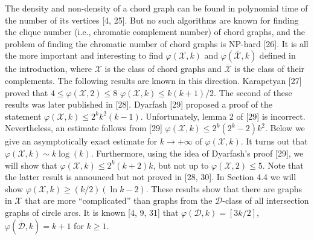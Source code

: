 \documentclass{article}
\begin{document}
    The density and non-density
    of a chord graph can be found 
    in polynomial time of 
    the number of its vertices [4, 25]. 
    But no such algorithms are known 
    for finding the clique 
    number (i.e., chromatic 
    complement number)
    of chord graphs, and the 
    problem of finding the 
    chromatic number of chord
    graphs is NP-hard [26]. 
    It is all the more 
    important and interesting
    to find $\varphi(\mathcal{X}, k)$ and 
    $\varphi(\overline{\mathcal{X}}, k)$
    defined in the introduction, 
    where $\mathcal{X}$ is the 
    class of chord graphs and
    $\overline{\mathcal{X}}$
    is the class of their 
    complements. 
    The following results 
    are known in this direction. 
    Karapetyan [27] proved that 
    $4 \leq \varphi\left(\mathcal{X}, 2\right) \leq 8$
    $\varphi\left(\mathcal{X}, k\right) \leq k(k+1)/2$. 
    The second of these 
    results was later published in [28]. 
    Dyarfash [29] proposed a proof 
    of the statement $\varphi\left(\mathcal{X}, k\right) \leq 2^k k^2 (k-1)$. 
    Unfortunately, lemma 2 of [29] is incorrect. 
    Nevertheless, an estimate follows from [29] 
    $\varphi\left(\mathcal{X}, k\right) \leq 2^k (2^k - 2)k^2$. 
    Below we give an asymptotically exact 
    estimate for $k \rightarrow +\infty$
    of $\varphi\left(\mathcal{X}, k\right)$. 
    It turns out that $\varphi\left(\mathcal{X}, k\right) \sim k \log (k)$. 
    Furthermore, using the idea of 
    Dyarfash's proof [29], 
    we will show that $\varphi\left(\mathcal{X}, k\right) \leq 2^k(k+2)k$, 
    but not up to $\varphi\left(\mathcal{X}, 2\right) \leq 5$.  
    Note that the latter result 
    is announced but 
    not proved in [28, 30]. 
    In Section 4.4 we will show 
    $\varphi(\mathcal{X}, k) \geq (k/2)(\ln k - 2)$. 
    These results show that there 
    are graphs in $\mathcal{X}$
    that are more “complicated” 
    than graphs from the
    $\mathcal{D}$-class of all 
    intersection graphs of circle arcs. 
    It is known [4, 9, 31] that $\varphi\left(\mathcal{D}, k\right) = [3k/2]$, 
    $\varphi(\bar{\mathcal{D}}, k) = k+1$
    for $k \geq 1$.
\end{document}
